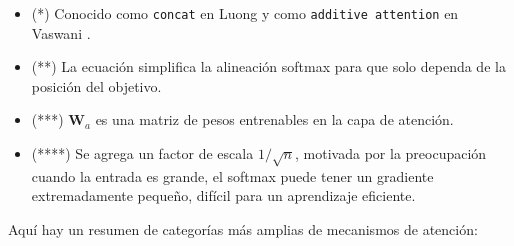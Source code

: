 \documentclass[conference]{IEEEtran}
\begin{document}
\begin{itemize}
\item \scriptsize{(*) Conocido como \texttt{concat} en Luong\cite{b4} y como \texttt{additive attention} en Vaswani \cite{b1}}.
\item (**) La ecuaci\'on simplifica la alineaci\'on softmax para que solo dependa de la posici\'on del objetivo.
\item (***) $\textbf{W}_a$ es una matriz de pesos entrenables en la capa de atenci\'on.
\item (****) Se agrega un factor de escala $1/\sqrt{n}$, motivada por la preocupaci\'on cuando la entrada es grande, el softmax puede tener un gradiente extremadamente peque\~no, dif\'icil para un aprendizaje eficiente.
	
\end{itemize}

\vspace{0.2cm}


Aqu\'i hay un resumen de categor\'ias m\'as amplias de mecanismos de atenci\'on:
\end{document}
